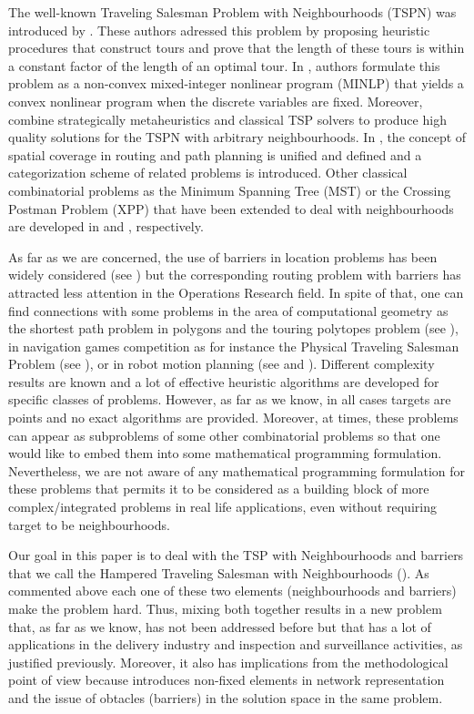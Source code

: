 \documentclass[a4paper,  review, authoryear, 1p.]{elsarticle}
\newcommand{\TSPN}{{\sf{H-TSPN}\xspace }}
\begin{document}
		The well-known Traveling Salesman Problem with Neighbourhoods (TSPN) was introduced by \citet{arkin_approximation_1994}. These authors adressed this problem by proposing heuristic procedures that construct tours and prove that the length of these tours is within a constant factor of the length of an optimal tour. In \citet{gentilini_travelling_2013}, authors formulate this problem as a non-convex mixed-integer nonlinear program (MINLP) that yields a convex nonlinear program when the discrete variables are fixed. Moreover, \citet{yuan_towards_2017} combine strategically metaheuristics and classical TSP solvers to produce high quality solutions for the TSPN with arbitrary neighbourhoods. In \citet{glock_spatial_2022}, the concept of spatial coverage in routing and path planning is unified and defined and a categorization scheme of related problems is introduced. Other classical combinatorial problems as the Minimum Spanning Tree (MST) or the Crossing Postman Problem (XPP) that have been  extended to deal with neighbourhoods are developed in \citet{blanco_minimum_2017} and \citet{puerto_routing_2022}, respectively. 
		
		As far as we are concerned, the use of barriers in location problems has been widely considered (see \citet{klamroth_single-facility_2002}) but the corresponding routing problem with barriers  has attracted less attention in the Operations Research field. In spite of that, one can find connections with some problems in the area of computational geometry as the shortest path problem in polygons and the touring polytopes problem (see \citet{mitchell_shortest_2017}), in navigation games competition  as for instance the Physical Traveling Salesman Problem (see \citet{perez_solving_2014}), or in robot motion planning (see \citet{hwang_potential_1992} and \citet{laumond_motion_1994}).  Different complexity results are known and a lot of effective heuristic algorithms are developed for specific classes of problems. However, as far as we know, in all cases targets are points and no exact algorithms are provided. Moreover, at times, these problems can appear as  subproblems of some other combinatorial problems so that one would like to embed them into some mathematical programming formulation. Nevertheless, we are not aware of any mathematical programming formulation for these problems that permits it to be considered as a building block of more complex/integrated problems in real life applications, even without requiring target to be neighbourhoods.
		
		Our goal  in this paper is to deal with the TSP with Neighbourhoods and barriers that we call the Hampered Traveling Salesman with Neighbourhoods (\TSPN ). As commented above each one of these two elements (neighbourhoods and barriers) make the problem hard. Thus, mixing both together results in a new problem that, as far as we know, has not been addressed before but that has a lot of applications in the delivery industry and inspection and surveillance activities, as justified previously. Moreover, it also has implications from the methodological point of view because introduces non-fixed elements in network representation and the issue of obtacles (barriers) in the solution space in the same problem.
		
\end{document}
